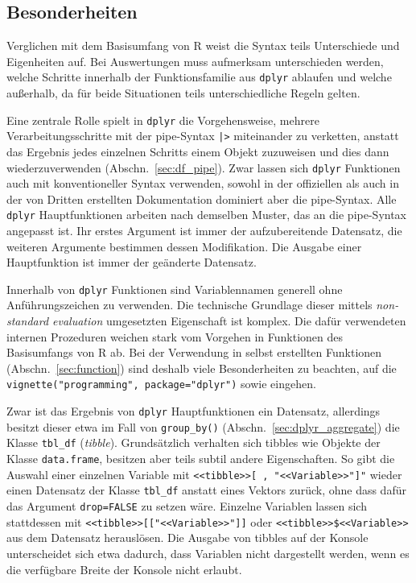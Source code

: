 \subsection{Besonderheiten}
\label{sec:dplyr_special}

Verglichen mit dem Basisumfang von R weist die Syntax teils Unterschiede und Eigenheiten auf. Bei Auswertungen muss aufmerksam unterschieden werden, welche Schritte innerhalb der Funktionsfamilie aus \lstinline!dplyr! ablaufen und welche außerhalb, da für beide Situationen teils unterschiedliche Regeln gelten.

Eine zentrale Rolle spielt in \lstinline!dplyr! die Vorgehensweise, mehrere Verarbeitungsschritte mit der pipe-Syntax \lstinline!|>! miteinander zu verketten, anstatt das Ergebnis jedes einzelnen Schritts einem Objekt zuzuweisen und dies dann wiederzuverwenden (Abschn.\ \ref{sec:df_pipe}). Zwar lassen sich \lstinline!dplyr! Funktionen auch mit konventioneller Syntax verwenden, sowohl in der offiziellen als auch in der von Dritten erstellten Dokumentation dominiert aber die pipe-Syntax. Alle \lstinline!dplyr! Hauptfunktionen arbeiten nach demselben Muster, das an die pipe-Syntax angepasst ist. Ihr erstes Argument ist immer der aufzubereitende Datensatz, die weiteren Argumente bestimmen dessen Modifikation. Die Ausgabe einer Hauptfunktion ist immer der geänderte Datensatz.

Innerhalb von \lstinline!dplyr! Funktionen sind Variablennamen generell ohne Anführungszeichen zu verwenden. Die technische Grundlage dieser mittels \emph{non-standard evaluation} umgesetzten Eigenschaft ist komplex. Die dafür verwendeten internen Prozeduren weichen stark vom Vorgehen in Funktionen des Basisumfangs von R ab. Bei der Verwendung in selbst erstellten Funktionen (Abschn.\ \ref{sec:function}) sind deshalb viele Besonderheiten zu beachten, auf die \lstinline!vignette("programming", package="dplyr")! sowie  eingehen.

Zwar ist das Ergebnis von \lstinline!dplyr! Hauptfunktionen ein Datensatz, allerdings besitzt dieser etwa im Fall von \lstinline!group_by()! (Abschn.\ \ref{sec:dplyr_aggregate}) die Klasse \lstinline!tbl_df! (\emph{tibble}). Grundsätzlich verhalten sich tibbles wie Objekte der Klasse \lstinline!data.frame!, besitzen aber teils subtil andere Eigenschaften. So gibt die Auswahl einer einzelnen Variable mit \lstinline!<<tibble>>[ , "<<Variable>>"]"! wieder einen Datensatz der Klasse \lstinline!tbl_df! anstatt eines Vektors zurück, ohne dass dafür das Argument \lstinline!drop=FALSE! zu setzen wäre. Einzelne Variablen lassen sich stattdessen mit \lstinline!<<tibble>>[["<<Variable>>"]]! oder \lstinline!<<tibble>>$<<Variable>>! aus dem Datensatz herauslösen. Die Ausgabe von tibbles auf der Konsole unterscheidet sich etwa dadurch, dass Variablen nicht dargestellt werden, wenn es die verfügbare Breite der Konsole nicht erlaubt.

